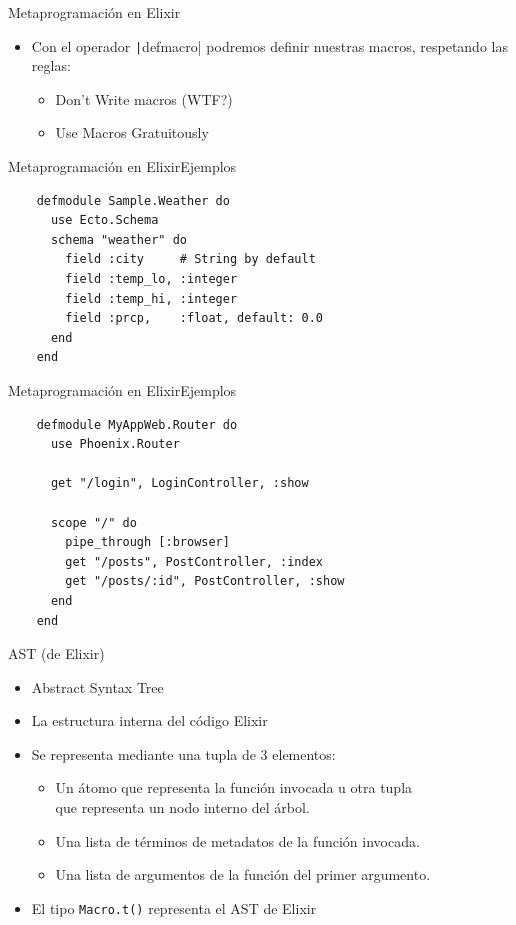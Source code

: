 \documentclass[14pt,aspectratio=169]{beamer}
\begin{document}
\begin{frame}{Metaprogramación en Elixir}
  \begin{itemize}
    \item Con el operador \texttt|defmacro| podremos definir
    nuestras macros, respetando las reglas\footnotemark:
    \begin{itemize}
      \item Don't Write macros (WTF?)
      \item Use Macros Gratuitously
    \end{itemize}
  \end{itemize}
\end{frame}

\begin{frame}[fragile]{Metaprogramación en Elixir}{Ejemplos}
  \begin{verbatim}
    defmodule Sample.Weather do
      use Ecto.Schema
      schema "weather" do
        field :city     # String by default
        field :temp_lo, :integer
        field :temp_hi, :integer
        field :prcp,    :float, default: 0.0
      end
    end
  \end{verbatim}
\end{frame}

\begin{frame}[fragile]{Metaprogramación en Elixir}{Ejemplos}
  \small\begin{verbatim}
    defmodule MyAppWeb.Router do
      use Phoenix.Router

      get "/login", LoginController, :show

      scope "/" do
        pipe_through [:browser]
        get "/posts", PostController, :index
        get "/posts/:id", PostController, :show
      end
    end
  \end{verbatim}
\end{frame}


\begin{frame}{AST (de Elixir)}
  \begin{itemize}
    \item Abstract Syntax Tree
    \item La estructura interna del código Elixir
    \item Se representa mediante una tupla de 3 elementos:
    \begin{itemize}
      \item Un átomo que representa la función invocada u otra tupla\\
      que representa un nodo interno del árbol.
      \item Una lista de términos de metadatos de la función invocada.
      \item Una lista de argumentos de la función del primer argumento.
    \end{itemize}
    \item El tipo \texttt{Macro.t()} representa el AST de Elixir
  \end{itemize}
\end{frame}
\end{document}

